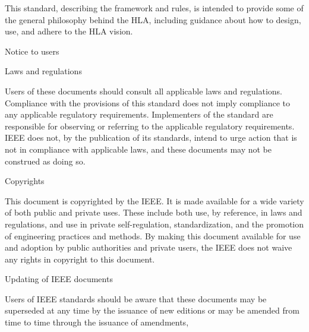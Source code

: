 \vspace{10.0pt}
This standard, describing the framework and rules, is intended to provide some of the general philosophy\linebreak
behind the HLA, including guidance about how to design, use, and adhere to the HLA vision.\par

\vspace{15.1pt}
{\frontSectionHeading Notice to users\par}

\vspace{14.9pt}
{\frontSectionHeading Laws and regulations\par}

\vspace{10.1pt}
Users of these documents should consult all applicable laws and regulations. Compliance with the\linebreak
provisions of this standard does not imply compliance to any applicable regulatory requirements.\linebreak
Implementers of the standard are responsible for observing or referring to the applicable regulatory\linebreak
requirements. IEEE does not, by the publication of its standards, intend to urge action that is not in\linebreak
compliance with applicable laws, and these documents may not be construed as doing so.\par

\vspace{18.0pt}
{\frontSectionHeading Copyrights\par}

\vspace{10.15pt}
This document is copyrighted by the IEEE. It is made available for a wide variety of both public and private\linebreak
uses. These include both use, by reference, in laws and regulations, and use in private self-regulation,\linebreak
standardization, and the promotion of engineering practices and methods. By making this document\linebreak
available for use and adoption by public authorities and private users, the IEEE does not waive any rights in\linebreak
copyright to this document.\par

\vspace{17.95pt}
{\frontSectionHeading Updating of IEEE documents\par}

\vspace{10.44pt}
Users of IEEE standards should be aware that these documents may be superseded at any time by the\linebreak
issuance of new editions or may be amended from time to time through the issuance of amendments,
\endgroup
\clearpage
